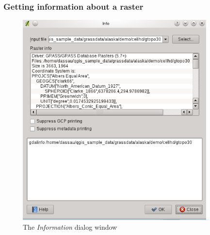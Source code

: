{\subsubsection{Getting information about a raster}
\begin{figure}[ht]
   \centering
   \caption{The \emph{Information} dialog window \nixcaption}\label{gdalinfo}
   \includegraphics[clip=true, width=10cm]{plugins_gdaltools_images/gdalinfo}
\end{figure}

}
